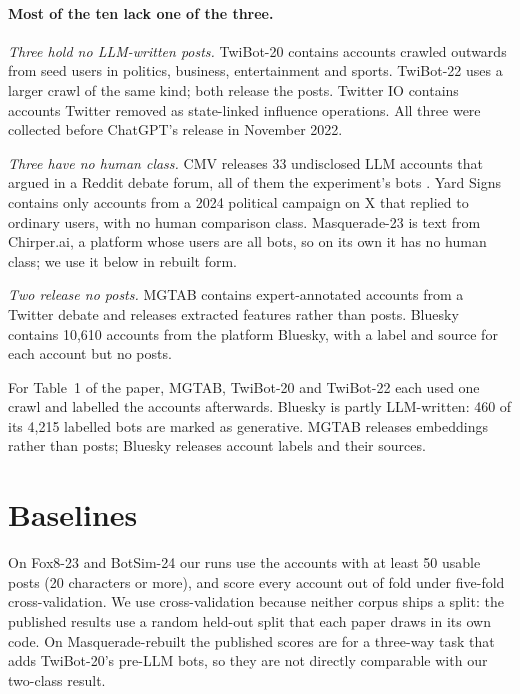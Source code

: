 \documentclass[10pt,a4paper]{article}
\begin{document}
\paragraph{Most of the ten lack one of the three.}
\emph{Three hold no LLM-written posts.}
TwiBot-20 \citep{feng2021twibot20} contains accounts crawled outwards from seed users in politics,
  business, entertainment and sports.
TwiBot-22 \citep{feng2022twibot22} uses a larger crawl of the same kind; both release the posts.
Twitter IO \citep{seckin2024labeled} contains accounts Twitter removed as state-linked influence
  operations.
All three were collected before ChatGPT's release in November 2022.

\emph{Three have no human class.}
CMV \citep{jaidka2026howfar} releases 33 undisclosed LLM accounts that argued in a Reddit debate
  forum, all of them the experiment's bots \citep{cmvmods2025disclosure}.
Yard Signs \citep{linvill2024yardsigns} contains only accounts from a 2024 political campaign
  on X that replied to ordinary users, with no human comparison class.
Masquerade-23 \citep{li2025masquerade} is text from Chirper.ai, a platform whose users are all
  bots, so on its own it has no human class; we use it below in rebuilt form.

\emph{Two release no posts.}
MGTAB \citep{shi2023mgtab} contains expert-annotated accounts from a Twitter debate and releases
  extracted features rather than posts.
Bluesky \citep{meng2026navigating} contains 10,610 accounts from the platform Bluesky, with a label and
  source for each account but no posts.

For Table~1 of the paper, MGTAB, TwiBot-20 and TwiBot-22 each used one crawl and labelled
  the accounts afterwards.
Bluesky is partly LLM-written: 460 of its 4,215 labelled bots are marked as generative.
MGTAB releases embeddings rather than posts; Bluesky releases account labels and their sources.

\section{Baselines}\label{app:baselines}
On Fox8-23 and BotSim-24 our runs use the accounts with at least 50 usable posts (20 characters or more), and score every account out of fold under five-fold cross-validation.
We use cross-validation because neither corpus ships a split: the published results use a random
  held-out split that each paper draws in its own code.
On Masquerade-rebuilt the published scores are for a three-way task that adds TwiBot-20's
  pre-LLM bots, so they are not directly comparable with our two-class result.
\end{document}
